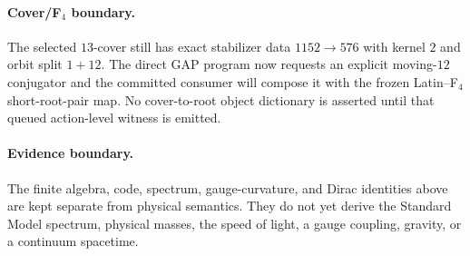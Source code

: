 \paragraph{Cover/F$_4$ boundary.}
The selected $13$-cover still has exact stabilizer data
$1152\to576$ with kernel $2$ and orbit split $1+12$.  The direct GAP program now requests
an explicit moving-$12$ conjugator and the committed consumer will compose it with the
frozen Latin--F$_4$ short-root-pair map.  No cover-to-root object dictionary is asserted
until that queued action-level witness is emitted.

\paragraph{Evidence boundary.}
The finite algebra, code, spectrum, gauge-curvature, and Dirac identities above are kept
separate from physical semantics.  They do not yet derive the Standard Model spectrum,
physical masses, the speed of light, a gauge coupling, gravity, or a continuum spacetime.
